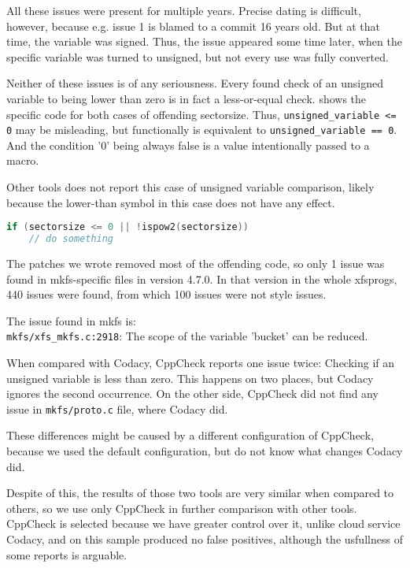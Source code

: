 All these issues were present for multiple years. Precise dating is
difficult, however, because e.g. issue 1 is blamed to a commit 16 years
old. But at that time, the variable was signed. Thus, the issue appeared
some time later, when the specific variable was turned to unsigned, but not
every use was fully converted.

Neither of these issues is of any seriousness. Every found check of an
unsigned variable to being lower than zero is in fact a less-or-equal
check.  shows the specific code for both cases
of offending sectorsize. Thus, {\tt unsigned\_variable <= 0} may be
misleading, but functionally is equivalent to {\tt unsigned\_variable ==
0}.  And the condition '0' being always false is a value intentionally
passed to a macro.

Other tools does not report this case of unsigned variable comparison,
likely because the lower-than symbol in this case does not have any effect.

\begin{lstlisting}[frame=none, basicstyle=\footnotesize\ttfamily,
language=C, numbers=none, numberstyle=\tiny\color{black},caption=
{Condition in which unsigned sectorsize is tested to be less than zero.},
label={lst:results:sectorsize}]
if (sectorsize <= 0 || !ispow2(sectorsize))
	// do something
\end{lstlisting}

The patches we wrote removed most of the offending code, so only 1 issue was
found in mkfs-specific files in version 4.7.0. In that version in the whole
xfsprogs, 440 issues were found, from which 100 issues were not style issues.

The issue found in mkfs  is:\\
{\tt mkfs/xfs\_mkfs.c:2918}: The scope of the variable 'bucket' can be reduced.

When compared with Codacy, CppCheck reports one issue twice: Checking if an
unsigned variable is less than zero. This happens on two places, but Codacy
ignores the second occurrence. On the other side, CppCheck did not find any
issue in {\tt mkfs/proto.c} file, where Codacy did.

These differences might be caused by a different configuration of CppCheck,
because we used the default configuration, but do not know what changes
Codacy did.

Despite of this, the results of those two tools are very similar when compared
to others, so we use only CppCheck in further comparison with other tools.
CppCheck is selected because we have greater control over it, unlike cloud
service Codacy, and on this sample produced no false positives, although the
usfullness of some reports is arguable.

